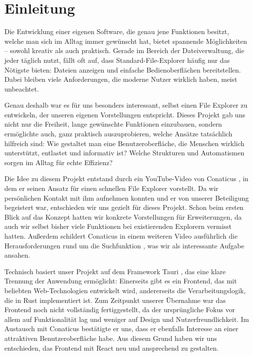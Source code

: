 \section{Einleitung}

Die Entwicklung einer eigenen Software, die genau jene Funktionen besitzt, welche man sich im Alltag
immer gewünscht hat, bietet spannende Möglichkeiten – sowohl kreativ als auch praktisch. Gerade im
Bereich der Dateiverwaltung, die jeder täglich nutzt, fällt oft auf, dass Standard-File-Explorer
häufig nur das Nötigste bieten: Dateien anzeigen und einfache Bedienoberflächen bereitstellen. Dabei
bleiben viele Anforderungen, die moderne Nutzer wirklich haben, meist unbeachtet.

Genau deshalb war es für uns besonders interessant, selbst einen File Explorer zu entwickeln, der
unseren eigenen Vorstellungen entspricht. Dieses Projekt gab uns nicht nur die Freiheit, lange
gewünschte Funktionen einzubauen, sondern ermöglichte auch, ganz praktisch auszuprobieren, welche
Ansätze tatsächlich hilfreich sind: Wie gestaltet man eine Benutzeroberfläche, die Menschen wirklich
unterstützt, entlastet und informativ ist? Welche Strukturen und Automatismen sorgen im Alltag für
echte Effizienz?

Die Idee zu diesem Projekt entstand durch ein YouTube-Video von Conaticus \cite{conaticus01}, in
dem er seinen Ansatz für einen schnellen File Explorer vorstellt. Da wir persönlichen Kontakt mit
ihm aufnehmen konnten und er von unserer Beteiligung begeistert war, entschieden wir uns gezielt für
dieses Projekt. Schon beim ersten Blick auf das Konzept hatten wir konkrete Vorstellungen für
Erweiterungen, da auch wir selbst bisher viele Funktionen bei existierenden Explorern vermisst
hatten. Außerdem schildert Conaticus in einem weiteren Video ausführlich die Herausforderungen rund
um die Suchfunktion \cite{conaticus02}, was wir als interessante Aufgabe ansahen.

Technisch basiert unser Projekt auf dem Framework Tauri \cite{tauri2025}, das eine klare Trennung
der Anwendung ermöglicht: Einerseits gibt es ein Frontend, das mit beliebten Web-Technologien
entwickelt wird, andererseits die Verarbeitungslogik, die in Rust implementiert ist. Zum Zeitpunkt
unserer Übernahme war das Frontend noch nicht vollständig fertiggestellt, da der ursprüngliche Fokus
vor allem auf Funktionalität lag und weniger auf Design und Nutzerfreundlichkeit. Im Austausch mit
Conaticus bestätigte er uns, dass er ebenfalls Interesse an einer attraktiven Benutzeroberfläche
habe. Aus diesem Grund haben wir uns entschieden, das Frontend mit React neu und ansprechend zu
gestalten.
